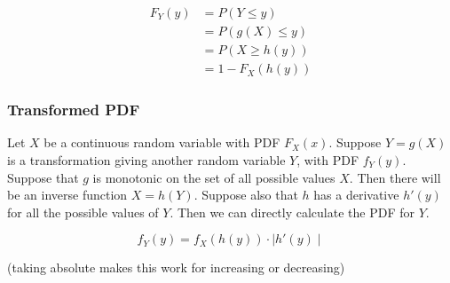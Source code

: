 \begin{align*}
     F_Y(y) &= P(Y \leq y) \\
     &= P(g(X)\leq y) \\
     &= P(X \geq h(y)) \\
     &= 1 - F_X(h(y))
\end{align*}

\subsubsection*{Transformed PDF}

Let $X$ be a continuous random variable with PDF $F_X(x)$.
Suppose $Y=g(X)$ is a transformation giving another random variable $Y$, with PDF $f_Y(y)$.
Suppose that $g$ is monotonic on the set of all possible values $X$.
Then there will be an inverse function $X=h(Y)$.
Suppose also that $h$ has a derivative $h'(y)$ for all the possible values of $Y$. Then we can directly calculate the PDF for $Y$.

$$ f_Y(y) = f_X(h(y)) \cdot \mid h'(y) \mid $$

(taking absolute makes this work for increasing or decreasing)

